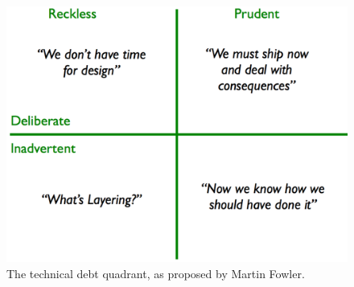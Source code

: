 \begin{figure}[!h]
	\centering
	\includegraphics[width=0.5\columnwidth]{images/introduction/technical_debt_quadrant}
	\caption{The technical debt quadrant, as proposed by Martin Fowler\cite{technicaldebtquadrant}.}
	\label{fig:technical-debt-quadrant}
\end{figure}

